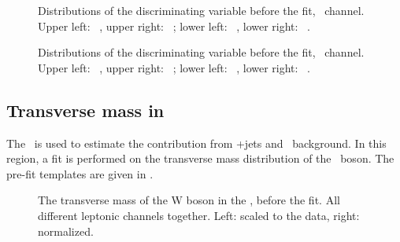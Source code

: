 \begin{figure}[ht]
	\centering
	\caption{Distributions of the discriminating variable before the fit, \eemu\  channel. Upper left: \TTSR\ \Zut , upper right: \TTSR\ \Zct ; lower left: \STSR\  \Zut , lower right: \STSR\  \Zct .}
	\label{fig:bdteeustack}
\end{figure}



\begin{figure}[ht]
	\centering
	\caption{Distributions of the discriminating variable before the fit, \eee\  channel. Upper left: \TTSR\ \Zut , upper right: \TTSR\ \Zct ; lower left: \STSR\  \Zut , lower right: \STSR\  \Zct .}
	\label{fig:bdteeestack}
\end{figure}

\subsection{Transverse mass in \WZCR}
The \WZCR\ is used to estimate the contribution from \WZ+jets and \NPL\ background. In this region, a fit is performed on the transverse mass distribution of the \PW\ boson. The pre-fit templates are given in . 

\begin{figure}[ht]
	\centering
	\caption{The transverse mass of the W boson in the \WZCR, before the fit. All different leptonic channels together. Left: scaled to the data, right: normalized.}
	\label{fig:mtwallstack}
\end{figure}

